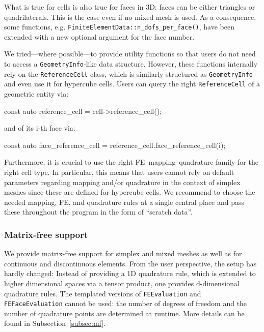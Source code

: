 \documentclass{ansarticle-preprint}
\begin{document}
What is true for cells is also true for faces in 3D: faces can be either triangles
or quadrilaterals. This is the case even if no mixed mesh is used. As a consequence, some functions, e.g. \texttt{FiniteElementData::n\_dofs\_per\_face()}, have been extended with a new optional argument for the face number.

We tried---where possible---to provide utility functions so that users do not need to access a \texttt{GeometryInfo}-like data structure. However, these functions internally rely on the \texttt{ReferenceCell} class, which is similarly structured as \texttt{GeometryInfo} and even use it for hypercube cells. Users can query the right \texttt{ReferenceCell} of a geometric entity via:
\begin{c++}
const auto reference_cell = cell->reference_cell();
\end{c++}
and of its i-th face via:
\begin{c++}
const auto face_reference_cell = reference_cell.face_reference_cell(i);
\end{c++}


Furthermore, it is crucial to use the right FE--mapping--quadrature family 
for the right cell type. In particular, this means that users cannot 
rely on default parameters regarding mapping and/or quadrature in the 
context of simplex meshes since these are defined for hypercube cells.
We recommend to choose the needed mapping,
FE, and quadrature rules at a single central place and pass these throughout the program
in the form of ``scratch data''.

\subsubsection{Matrix-free support}

We provide matrix-free support for simplex and mixed meshes as well as for
continuous and discontinuous elements. From the user perspective, the setup has
hardly changed:
%
Instead of providing a 1D quadrature rule, which is extended to higher dimensional
spaces via a tensor product, one provides d-dimensional quadrature rules.
The templated versions of \texttt{FEEvaluation} and \texttt{FEFaceEvaluation} cannot be used: the number of degrees of freedom and the number of quadrature points are determined at runtime. More details can be found in Subsection~\ref{subsec:mf}.
\end{document}
